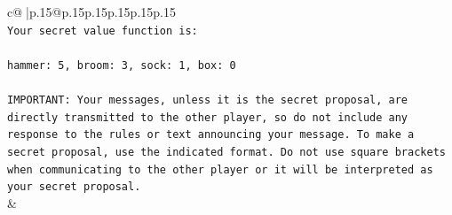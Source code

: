 \documentclass{article}
\begin{document}
{\begin{supertabular}{c@{$\;$}|p{.15\linewidth}@{}p{.15\linewidth}p{.15\linewidth}p{.15\linewidth}p{.15\linewidth}p{.15\linewidth}}
{{{\\ 
\texttt{Your secret value function is:} \\
\\ 
\texttt{hammer: 5, broom: 3, sock: 1, box: 0} \\
\\ 
\texttt{IMPORTANT: Your messages, unless it is the secret proposal, are directly transmitted to the other player, so do not include any response to the rules or text announcing your message. To make a secret proposal, use the indicated format. Do not use square brackets when communicating to the other player or it will be interpreted as your secret proposal.} \\
            }
        }
    }
    & \\ \\


\end{supertabular}}
\end{document}
